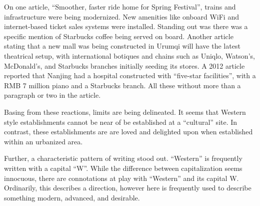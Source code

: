 On one article, ``Smoother, faster ride home for Spring Festival'', trains and
infrastructure were being modernized. New amenities like onboard WiFi and
internet-based ticket sales systems were installed. Standing out was there was a
specific mention of Starbucks coffee being served on board.  Another article
stating that a new mall was being constructed in Urumqi will have the latest
theatrical setup, with international botiques and chains such as Uniqlo,
Watson's, McDonald's, and Starbucks branches initially seeding its stores. A
2012 article reported that Nanjing had a hospital constructed with ``five-star
facilities'', with a RMB 7 million piano and a Starbucks branch. All these
without more than a paragraph or two in the article.

Basing from these reactions, limits are being delineated. It seems that
Western style establishments cannot be near of be established at a ``cultural''
site. In contrast, these establishments are are loved and delighted upon when
established within an urbanized area.

Further, a characteristic pattern of writing stood out. ``Western'' is
frequently written with a capital ``W''. While the difference between
capitalization seems innocuous, there are connotations at play with ``Western''
and its capital W. Ordinarily, this describes a direction, however here is
frequently used to describe something modern, advanced, and desirable.





